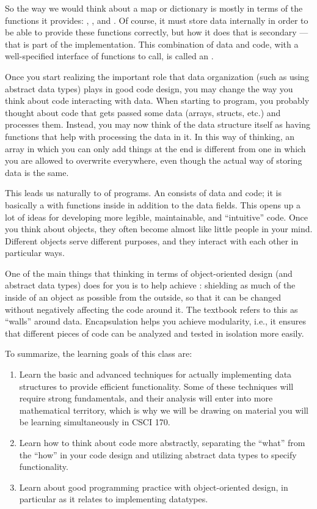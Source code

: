 So the way we would think about a map or dictionary is mostly in terms
of the functions it provides:
, , and .
Of course, it must store data internally in order to be
able to provide these functions correctly, but how it does that is
secondary --- that is part of the implementation.
This combination of data and code, with a well-specified interface of
functions to call, is called an .

Once you start realizing the important role that data organization
(such as using abstract data types) plays in good code design,
you may change the way you think about code interacting with data.
When starting to program, you probably thought about code that gets
passed some data (arrays, structs, etc.) and processes them.
Instead, you may now think of the data structure itself as having functions
that help with processing the data in it. 
In this way of thinking, an array in which you can only add things at
the end is different from one in which you are allowed to overwrite
everywhere, even though the actual way of storing data is the same.

This leads us naturally to  of programs. 
An  consists of data and code; it is basically a
 with functions inside in addition to the data fields. 
This opens up a lot of ideas for developing more legible,
maintainable, and ``intuitive'' code.
Once you think about objects, they often become almost like little
people in your mind.
Different objects serve different purposes,
and they interact with each other in particular ways.

One of the main things that thinking in terms of object-oriented
design (and abstract data types) does for you is to help achieve 
: shielding as much of the inside of an object as
possible from the outside, so that it can be changed without
negatively affecting the code around it.
The textbook refers to this as ``walls'' around data.
Encapsulation helps you achieve modularity, i.e., it ensures that
different pieces of code can be analyzed and tested in isolation more 
easily.

\medskip

To summarize, the learning goals of this class are:
\begin{enumerate}
\item Learn the basic and advanced techniques for actually
  implementing data structures to provide efficient functionality.
  Some of these techniques will require strong fundamentals,
  and their analysis will enter into more mathematical territory,
  which is why we will be drawing on material you will be learning
  simultaneously in CSCI 170.
\item Learn how to think about code more abstractly, separating the
  ``what'' from the ``how'' in your code design and utilizing abstract
  data types to specify functionality.
\item Learn about good programming practice with object-oriented
  design, in particular as it relates to implementing datatypes.
\end{enumerate}
